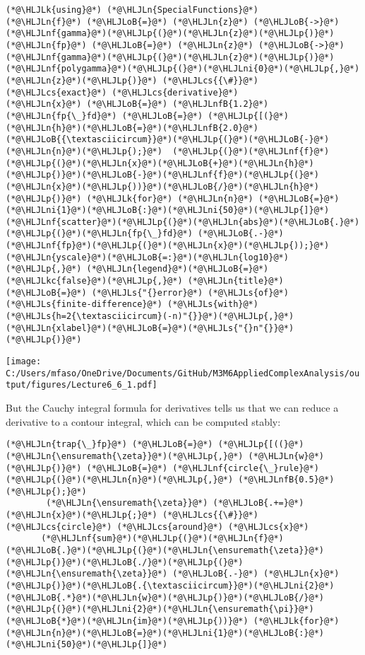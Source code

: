 \documentclass[12pt,landscape]{article}
\newcommand{\HLJLk}[1]{\textcolor[RGB]{148,91,176}{\textbf{#1}}}
\newcommand{\HLJLkc}[1]{\textcolor[RGB]{59,151,46}{\textit{#1}}}
\newcommand{\HLJLn}[1]{#1}
\newcommand{\HLJLnf}[1]{\textcolor[RGB]{66,102,213}{#1}}
\newcommand{\HLJLs}[1]{\textcolor[RGB]{201,61,57}{#1}}
\newcommand{\HLJLnfB}[1]{\textcolor[RGB]{59,151,46}{#1}}
\newcommand{\HLJLni}[1]{\textcolor[RGB]{59,151,46}{#1}}
\newcommand{\HLJLoB}[1]{\textcolor[RGB]{102,102,102}{\textbf{#1}}}
\newcommand{\HLJLp}[1]{#1}
\newcommand{\HLJLcs}[1]{\textcolor[RGB]{153,153,119}{\textit{#1}}}
\def\cent#1{\begin{center}#1\end{center} }
\begin{document}
{\begin{lstlisting}
(*@\HLJLk{using}@*) (*@\HLJLn{SpecialFunctions}@*)
(*@\HLJLn{f}@*) (*@\HLJLoB{=}@*) (*@\HLJLn{z}@*) (*@\HLJLoB{->}@*) (*@\HLJLnf{gamma}@*)(*@\HLJLp{(}@*)(*@\HLJLn{z}@*)(*@\HLJLp{)}@*)
(*@\HLJLn{fp}@*) (*@\HLJLoB{=}@*) (*@\HLJLn{z}@*) (*@\HLJLoB{->}@*) (*@\HLJLnf{gamma}@*)(*@\HLJLp{(}@*)(*@\HLJLn{z}@*)(*@\HLJLp{)}@*)(*@\HLJLnf{polygamma}@*)(*@\HLJLp{(}@*)(*@\HLJLni{0}@*)(*@\HLJLp{,}@*)(*@\HLJLn{z}@*)(*@\HLJLp{)}@*) (*@\HLJLcs{{\#}}@*) (*@\HLJLcs{exact}@*) (*@\HLJLcs{derivative}@*)
(*@\HLJLn{x}@*) (*@\HLJLoB{=}@*) (*@\HLJLnfB{1.2}@*)
(*@\HLJLn{fp{\_}fd}@*) (*@\HLJLoB{=}@*) (*@\HLJLp{[(}@*)(*@\HLJLn{h}@*)(*@\HLJLoB{=}@*)(*@\HLJLnfB{2.0}@*)(*@\HLJLoB{{\textasciicircum}}@*)(*@\HLJLp{(}@*)(*@\HLJLoB{-}@*)(*@\HLJLn{n}@*)(*@\HLJLp{);}@*)  (*@\HLJLp{(}@*)(*@\HLJLnf{f}@*)(*@\HLJLp{(}@*)(*@\HLJLn{x}@*)(*@\HLJLoB{+}@*)(*@\HLJLn{h}@*)(*@\HLJLp{)}@*)(*@\HLJLoB{-}@*)(*@\HLJLnf{f}@*)(*@\HLJLp{(}@*)(*@\HLJLn{x}@*)(*@\HLJLp{))}@*)(*@\HLJLoB{/}@*)(*@\HLJLn{h}@*)(*@\HLJLp{)}@*) (*@\HLJLk{for}@*) (*@\HLJLn{n}@*) (*@\HLJLoB{=}@*) (*@\HLJLni{1}@*)(*@\HLJLoB{:}@*)(*@\HLJLni{50}@*)(*@\HLJLp{]}@*)
(*@\HLJLnf{scatter}@*)(*@\HLJLp{(}@*)(*@\HLJLn{abs}@*)(*@\HLJLoB{.}@*)(*@\HLJLp{(}@*)(*@\HLJLn{fp{\_}fd}@*) (*@\HLJLoB{.-}@*) (*@\HLJLnf{fp}@*)(*@\HLJLp{(}@*)(*@\HLJLn{x}@*)(*@\HLJLp{));}@*) (*@\HLJLn{yscale}@*)(*@\HLJLoB{=:}@*)(*@\HLJLn{log10}@*)(*@\HLJLp{,}@*) (*@\HLJLn{legend}@*)(*@\HLJLoB{=}@*)(*@\HLJLkc{false}@*)(*@\HLJLp{,}@*) (*@\HLJLn{title}@*) (*@\HLJLoB{=}@*) (*@\HLJLs{"{}error}@*) (*@\HLJLs{of}@*) (*@\HLJLs{finite-difference}@*) (*@\HLJLs{with}@*) (*@\HLJLs{h=2{\textasciicircum}(-n)"{}}@*)(*@\HLJLp{,}@*) (*@\HLJLn{xlabel}@*)(*@\HLJLoB{=}@*)(*@\HLJLs{"{}n"{}}@*)(*@\HLJLp{)}@*)
\end{lstlisting}

\cent{\texttt{[image: C:/Users/mfaso/OneDrive/Documents/GitHub/M3M6AppliedComplexAnalysis/output/figures/Lecture6\_6\_1.pdf]}}

But the Cauchy integral formula for derivatives tells us that we can reduce a derivative to a contour integral, which can be computed stably:


\begin{lstlisting}
(*@\HLJLn{trap{\_}fp}@*) (*@\HLJLoB{=}@*) (*@\HLJLp{[((}@*)(*@\HLJLn{\ensuremath{\zeta}}@*)(*@\HLJLp{,}@*) (*@\HLJLn{w}@*)(*@\HLJLp{)}@*) (*@\HLJLoB{=}@*) (*@\HLJLnf{circle{\_}rule}@*)(*@\HLJLp{(}@*)(*@\HLJLn{n}@*)(*@\HLJLp{,}@*) (*@\HLJLnfB{0.5}@*)(*@\HLJLp{);}@*)
        (*@\HLJLn{\ensuremath{\zeta}}@*) (*@\HLJLoB{.+=}@*) (*@\HLJLn{x}@*)(*@\HLJLp{;}@*) (*@\HLJLcs{{\#}}@*) (*@\HLJLcs{circle}@*) (*@\HLJLcs{around}@*) (*@\HLJLcs{x}@*)
       (*@\HLJLnf{sum}@*)(*@\HLJLp{(}@*)(*@\HLJLn{f}@*)(*@\HLJLoB{.}@*)(*@\HLJLp{(}@*)(*@\HLJLn{\ensuremath{\zeta}}@*)(*@\HLJLp{)}@*)(*@\HLJLoB{./}@*)(*@\HLJLp{(}@*)(*@\HLJLn{\ensuremath{\zeta}}@*) (*@\HLJLoB{.-}@*) (*@\HLJLn{x}@*)(*@\HLJLp{)}@*)(*@\HLJLoB{.{\textasciicircum}}@*)(*@\HLJLni{2}@*) (*@\HLJLoB{.*}@*)(*@\HLJLn{w}@*)(*@\HLJLp{)}@*)(*@\HLJLoB{/}@*)(*@\HLJLp{(}@*)(*@\HLJLni{2}@*)(*@\HLJLn{\ensuremath{\pi}}@*)(*@\HLJLoB{*}@*)(*@\HLJLn{im}@*)(*@\HLJLp{))}@*) (*@\HLJLk{for}@*) (*@\HLJLn{n}@*)(*@\HLJLoB{=}@*)(*@\HLJLni{1}@*)(*@\HLJLoB{:}@*)(*@\HLJLni{50}@*)(*@\HLJLp{]}@*)


\end{lstlisting}}
\end{document}
